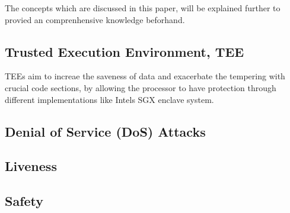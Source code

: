 The concepts which are discussed in this paper, will be explained further to provied an comprenhensive knowledge beforhand.

\subsection{Trusted Execution Environment, TEE}

TEEs aim to increae the saveness of data and exacerbate the tempering with crucial code sections, by allowing the processor to have protection through different implementations 
like Intels SGX enclave system. 

\subsection{Denial of Service (DoS) Attacks}

\subsection{Liveness}

\subsection{Safety}